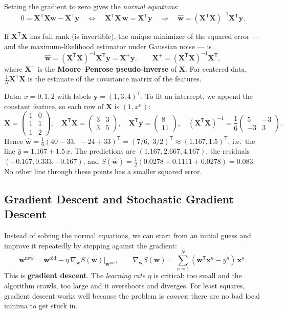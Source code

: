 \documentclass[11pt, oneside]{book}
\newcommand{\grad}{\nabla}               %
\newcommand{\T}{^{\mathsf{T}}}           %
\newcommand{\inv}{^{-1}}                 %
\newcommand{\bx}{\bm{x}}        \newcommand{\by}{\bm{y}}
\newcommand{\bw}{\bm{w}}        \newcommand{\bW}{\bm{W}}
\newcommand{\bX}{\bm{X}}        \newcommand{\bY}{\bm{Y}}
\newcommand{\what}{\hat{\bm{w}}}
\let\originalsubsection\subsection
\renewcommand{\subsection}{\Needspace{6\baselineskip}\originalsubsection}
\begin{document}
Setting the gradient to zero gives the \emph{normal equations}:
\[
  0 = \bX\T\bX\bw - \bX\T\by
  \quad\Longleftrightarrow\quad
  \bX\T\bX\,\bw = \bX\T\by
  \quad\Longrightarrow\quad
  \what = (\bX\T\bX)\inv\bX\T\by .
\]

\begin{thmbox}[title={Least-squares solution}]
If $\bX\T\bX$ has full rank (is invertible), the unique minimizer of the
squared error --- and the maximum-likelihood estimator under Gaussian noise
--- is
\[
  \what = (\bX\T\bX)\inv\bX\T\by = \bX^{+}\by,
  \qquad \bX^{+} = (\bX\T\bX)\inv\bX\T,
\]
where $\bX^{+}$ is the \textbf{Moore--Penrose pseudo-inverse} of $\bX$.
For centered data, $\frac1N\bX\T\bX$ is the estimate of the covariance
matrix of the features.
\end{thmbox}

\begin{exbox}[title={Fitting a line through three points}]
Data: $x = 0, 1, 2$ with labels $\by = (1, 3, 4)\T$. To fit an intercept, we
append the constant feature, so each row of $\bX$ is $(1, x^n)$:
\[
  \bX = \begin{pmatrix} 1 & 0 \\ 1 & 1 \\ 1 & 2 \end{pmatrix}, \quad
  \bX\T\bX = \begin{pmatrix} 3 & 3 \\ 3 & 5 \end{pmatrix}, \quad
  \bX\T\by = \begin{pmatrix} 8 \\ 11 \end{pmatrix}, \quad
  (\bX\T\bX)\inv = \frac16\begin{pmatrix} 5 & -3 \\ -3 & 3 \end{pmatrix}.
\]
Hence $\what = \frac16(40 - 33,\; -24 + 33)\T = (7/6,\; 3/2)\T \approx
(1.167, 1.5)\T$, i.e.\ the line $\hat y = 1.167 + 1.5\,x$. The predictions are
$(1.167, 2.667, 4.167)$, the residuals $(-0.167, 0.333, -0.167)$, and
$S(\what) = \frac12(0.0278 + 0.1111 + 0.0278) = 0.083$. No other line through
these points has a smaller squared error.
\end{exbox}

\subsection{Gradient Descent and Stochastic Gradient Descent}

Instead of solving the normal equations, we can start from an initial
guess and improve it repeatedly by stepping against the gradient:
\[
  \bw^{\text{new}} = \bw^{\text{old}} - \eta\, \grad_{\bw} S(\bw)\big|_{\bw^{\text{old}}},
  \qquad
  \grad_{\bw} S(\bw) = \sum_{n=1}^{N} (\bw\T\bx^n - y^n)\,\bx^n .
\]
This is \textbf{gradient descent}. The \emph{learning rate} $\eta$ is
critical: too small and the algorithm crawls, too large and it overshoots
and diverges. For least squares, gradient descent works well because the
problem is \emph{convex}: there are no bad local minima to get stuck in.
\end{document}
